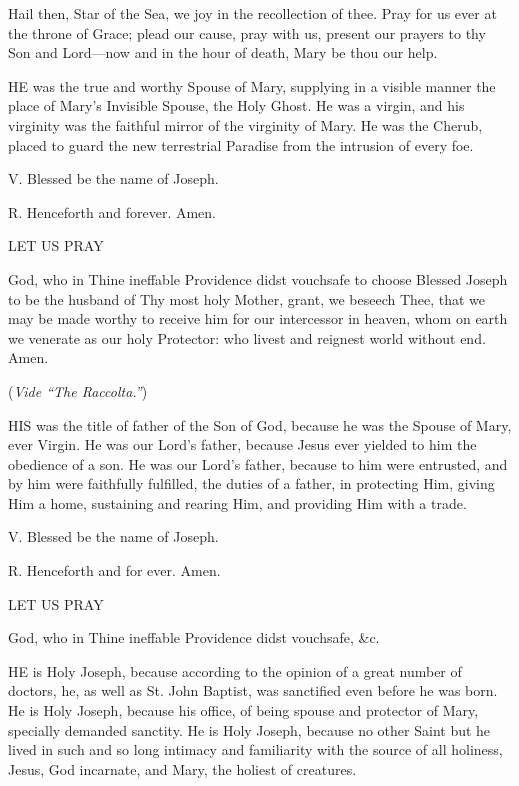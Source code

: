 Hail then, Star of the Sea, we joy in the
recollection of thee. Pray for us ever at the throne of Grace; plead our
cause, pray with us, present our prayers to thy Son and Lord—now and
in the hour of death, Mary be thou our help.



HE was the
true and worthy Spouse of Mary, supplying in a visible manner the place
of Mary’s Invisible Spouse, the Holy Ghost. He was a virgin, and his
virginity was the faithful mirror of the virginity of Mary. He was the
Cherub, placed to guard the new terrestrial Paradise from the intrusion
of every foe.

V. Blessed be the name of Joseph.

R. Henceforth and forever. Amen.

LET
US PRAY

God, who in Thine ineffable Providence didst
vouchsafe to choose Blessed Joseph to be the husband of Thy most holy
Mother, grant, we beseech Thee, that we may be made worthy to receive
him for our intercessor in heaven, whom on earth we venerate as our holy
Protector: who livest and reignest world without end. Amen.

(\emph{Vide “The Raccolta.”})


HIS was the
title of father of the Son of God, because he was the Spouse of Mary,
ever Virgin. He was our Lord’s father, because Jesus ever yielded to
him the obedience of a son. He was our Lord’s father, because to him
were entrusted, and by him were faithfully fulfilled, the duties of a
father, in protecting Him, giving Him a home, sustaining and rearing
Him, and providing Him with a trade.

V. Blessed be the name of Joseph.

R. Henceforth and for ever. Amen.

LET
US PRAY

God, who in Thine ineffable Providence didst
vouchsafe, \&c.


HE is Holy
Joseph, because according to the opinion of a great number of doctors,
he, as well as St. John Baptist, was sanctified even before he was born.
He is Holy Joseph, because his office, of being spouse and protector of
Mary, specially demanded sanctity. He is Holy Joseph, because no other
Saint but he lived in such and so long intimacy and familiarity with the
source of all holiness, Jesus, God incarnate, and Mary, the holiest of
creatures.

